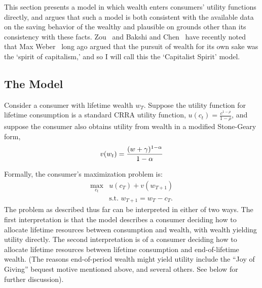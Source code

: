 \documentclass[titlepage,12pt]{article}
\begin{document}
This section presents a model in which wealth enters consumers' 
utility functions directly, and argues that such a model is both 
consistent with the available data on the saving behavior of the 
wealthy and plausible on grounds other than its consistency with 
these facts.  Zou~\cite{zou:spirit} and Bakshi and 
Chen~\cite{bakshi&chen:spirit} have recently noted that Max 
Weber~\cite{weber:capitalism} long ago argued that the pursuit of 
wealth for its own sake was the `spirit of capitalism,' and so I will 
call this the `Capitalist Spirit' model.

\hypertarget{the-model}{}
\subsection{The Model}
\label{subsec:CapitalistModel}

Consider a consumer with lifetime wealth $w_{T}$.  Suppose the utility 
function for lifetime consumption is a standard CRRA utility function, 
$u(c_{t}) = \frac{c^{1-\rho}}{1-\rho}$, and suppose the consumer also 
obtains utility from wealth in a modified Stone-Geary form,
$$
  v(w_{t}) = \frac{(w + \gamma)^{1-\alpha}}{1-\alpha} \notag
$$

Formally, the consumer's maximization problem is:
\begin{eqnarray}
 	\max_{c_{t}} & u(c_{T}) + v(w_{T+1}) \\ \nonumber
  	           & \mbox{s.t.~} w_{T+1} = w_{T} - c_{T}.  \nonumber
	\label{eq:LastPeriodProb}
\end{eqnarray}
The problem as described thus far can be interpreted in either of two 
ways.  The first interpretation is that the model describes a consumer 
deciding how to allocate lifetime resources between consumption and 
wealth, with wealth yielding utility directly.  The second 
interpretation is of a consumer deciding how to allocate lifetime 
resources between lifetime consumption and end-of-lifetime wealth.  
(The reasons end-of-period wealth might yield utility include the ``Joy 
of Giving'' bequest motive mentioned above, and several others.  See 
below for further discussion).  
\end{document}
